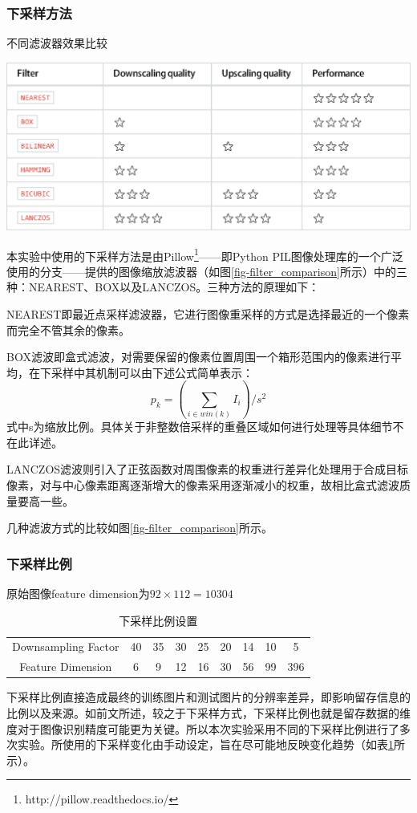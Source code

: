 \documentclass[UTF8]{ctexart}
\begin{document}
\subsubsection{下采样方法}
\begin{table}[htbp]
    \centering
    \caption{不同滤波器效果比较\protect\footnotemark}\label{fig-filter_comparison}
    \includegraphics[scale = 0.7]{Filter.eps}
\end{table}
\protect{}
本实验中使用的下采样方法是由Pillow\footnote{http://pillow.readthedocs.io/
}——即Python PIL图像处理库的一个广泛使用的分支——提供的图像缩放滤波器（如图\ref{fig-filter_comparison}所示）中的三种：NEAREST、BOX以及LANCZOS。三种方法的原理如下：\par
NEAREST即最近点采样滤波器，它进行图像重采样的方式是选择最近的一个像素而完全不管其余的像素。\par
BOX滤波即盒式滤波，对需要保留的像素位置周围一个箱形范围内的像素进行平均，在下采样中其机制可以由下述公式简单表示：
\begin{equation}\label{eq-15}
    p_k=\left({\sum_{i\in win(k)}{I_i}}\right)/s^2
\end{equation}
式中s为缩放比例。具体关于非整数倍采样的重叠区域如何进行处理等具体细节不在此详述。\par
LANCZOS滤波则引入了正弦函数对周围像素的权重进行差异化处理用于合成目标像素，对与中心像素距离逐渐增大的像素采用逐渐减小的权重，故相比盒式滤波质量要高一些。\par
几种滤波方式的比较如图\ref{fig-filter_comparison}所示。

\subsubsection{下采样比例}
\begin{table}[htbp]
    \centering
    \caption{下采样比例设置}{原始图像feature dimension为\(92\times 112=10304\)}\label{tab-downsampling_factor}
    \begin{tabular}{ccccccccc}
        \toprule
        Downsampling Factor & 40 & 35 & 30 & 25 & 20 & 14 & 10 & 5 \\
        Feature Dimension & 6 & 9 & 12 & 16 & 30 & 56 & 99 & 396 \\
        \bottomrule
    \end{tabular}
\end{table}
下采样比例直接造成最终的训练图片和测试图片的分辨率差异，即影响留存信息的比例以及来源。如前文所述，较之于下采样方式，下采样比例也就是留存数据的维度对于图像识别精度可能更为关键。所以本次实验采用不同的下采样比例进行了多次实验。所使用的下采样变化由手动设定，旨在尽可能地反映变化趋势（如表\ref{tab-downsampling_factor}所示）。
\end{document}
